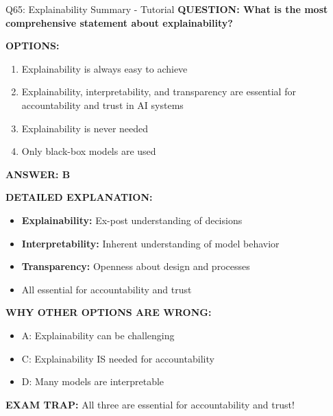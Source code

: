 \documentclass[8pt]{beamer}
\begin{document}
	\begin{frame}{Q65: Explainability Summary - Tutorial}
		\fontsize{6.5}{7.5}\selectfont
		\textbf{QUESTION: What is the most comprehensive statement about explainability?}
		
		\vspace{0.1cm}
		\textbf{OPTIONS:}
		\begin{enumerate}
			\item Explainability is always easy to achieve
			\item Explainability, interpretability, and transparency are essential for accountability and trust in AI systems
			\item Explainability is never needed
			\item Only black-box models are used
		\end{enumerate}
		
		\vspace{0.1cm}
		\textcolor{myblue}{\textbf{ANSWER: B}}
		
		\vspace{0.1cm}
		\textbf{DETAILED EXPLANATION:}
		\begin{itemize}
			\item \textbf{Explainability:} Ex-post understanding of decisions
			\item \textbf{Interpretability:} Inherent understanding of model behavior
			\item \textbf{Transparency:} Openness about design and processes
			\item All essential for accountability and trust
		\end{itemize}
		
		\vspace{0.1cm}
		\textcolor{myred}{\textbf{WHY OTHER OPTIONS ARE WRONG:}}
		\begin{itemize}
			\item \textcolor{myred}{A:} Explainability can be challenging
			\item \textcolor{myred}{C:} Explainability IS needed for accountability
			\item \textcolor{myred}{D:} Many models are interpretable
		\end{itemize}
		
		\textcolor{myred}{\textbf{EXAM TRAP:}} All three are \textcolor{myblue}{essential for accountability and trust}!
	\end{frame}
	
	
\end{document}
